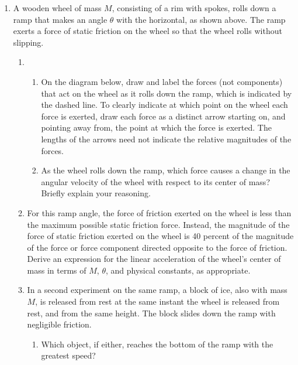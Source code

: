 \documentclass{../../../oss-apphys}
\begin{document}

\begin{enumerate}
\item A wooden wheel of mass $M$, consisting of a rim with spokes, rolls down
  a ramp that makes an angle $\theta$ with the horizontal, as shown above. The
  ramp exerts a force of static friction on the wheel so that the wheel rolls
  without slipping.
  \begin{enumerate}
  \item
    \begin{enumerate}
    \item On the diagram below, draw and label the forces (not components) that
      act on the wheel as it rolls down the ramp, which is indicated by the
      dashed line. To clearly indicate at which point on the wheel each force
      is exerted, draw each force as a distinct arrow starting on, and pointing
      away from, the point at which the force is exerted. The lengths of the
      arrows need not indicate the relative magnitudes of the forces.
    \item As the wheel rolls down the ramp, which force causes a change in the
      angular velocity of the wheel with respect to its center of mass? Briefly
      explain your reasoning.
    \end{enumerate}

  \item For this ramp angle, the force of friction exerted on the wheel is less
    than the maximum possible static friction force. Instead, the magnitude of
    the force of static friction exerted on the wheel is 40 percent of the
    magnitude of the force or force component directed opposite to the force of
    friction. Derive an expression for the linear acceleration of the wheel's
    center of mass in terms of $M$, $\theta$, and physical constants, as
    appropriate.
    
  \item In a second experiment on the same ramp, a block of ice, also with mass
    $M$, is released from rest at the same instant the wheel is released from
    rest, and from the same height. The block slides down the ramp with
    negligible friction.
    \begin{enumerate}
    \item Which object, if either, reaches the bottom of the ramp with the
      greatest speed?


\end{enumerate}
\end{enumerate}
\end{enumerate}
\end{document}
